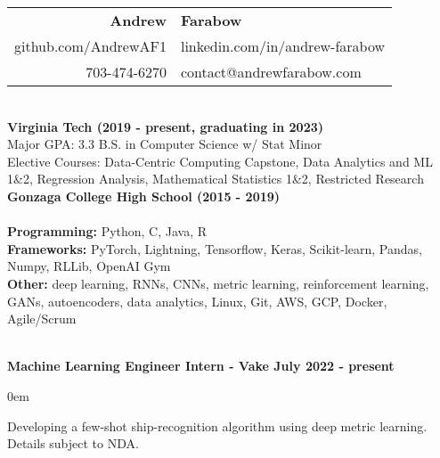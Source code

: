 \documentclass{article}
\begin{document}
\begin{center}
  \begin{tabular}{r l}
    {\huge\textbf{Andrew}}             & {\huge\textbf{Farabow}}        \\
    \hspace{35pt} github.com/AndrewAF1 & linkedin.com/in/andrew-farabow \\
    703-474-6270                       & contact@andrewfarabow.com      \\
  \end{tabular}


  \begin{flushleft}
    \begin{multicols}{2}
      {\large\textbf{\underline{}}} \\
      \textbf{Virginia Tech (2019 - present, graduating in 2023)} \\
      Major GPA: 3.3 \; B.S. in Computer Science w/ Stat Minor \\
      Elective Courses: Data-Centric Computing Capstone, Data Analytics and ML 1\&2, Regression Analysis, Mathematical Statistics 1\&2, Restricted Research \\
      \textbf{Gonzaga College High School	(2015 - 2019)} \\


      \columnbreak
      {\large\textbf{\underline{}}} \\
      {\textbf{Programming:}} Python, C, Java, R \\
      {\textbf{Frameworks:}} PyTorch, Lightning, Tensorflow, Keras, Scikit-learn, Pandas, Numpy, RLLib, OpenAI Gym \\
      {\textbf{Other:}} deep learning, RNNs, CNNs, metric learning, reinforcement learning, GANs, autoencoders, data analytics, Linux, Git, AWS, GCP, Docker, Agile/Scrum \\ %

    \end{multicols}

    {\large\textbf{\underline{}}} \\

    \textbf{Machine Learning Engineer Intern - Vake \hfill July 2022 - present}
    \begin{compactitem}
      \itemsep0em
      \item Developing a few-shot ship-recognition algorithm using deep metric learning. Details subject to NDA.
    \end{compactitem}


\end{flushleft}
\end{center}
\end{document}
